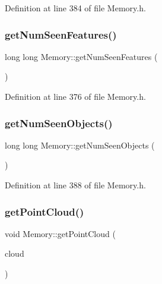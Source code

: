 Definition at line 384 of file Memory.\+h.

\mbox{\label{class_memory_aff0dd81352bffafc0989c71721f5c685}} 
\subsubsection{\texorpdfstring{get\+Num\+Seen\+Features()}{getNumSeenFeatures()}}
{\footnotesize\ttfamily long long Memory\+::get\+Num\+Seen\+Features (\begin{DoxyParamCaption}{ }\end{DoxyParamCaption})\hspace{0.3cm}{\ttfamily [inline]}}



Definition at line 376 of file Memory.\+h.

\mbox{\label{class_memory_aee4eb4b1f005a36bd59a0b159d6b8a32}} 
\subsubsection{\texorpdfstring{get\+Num\+Seen\+Objects()}{getNumSeenObjects()}}
{\footnotesize\ttfamily long long Memory\+::get\+Num\+Seen\+Objects (\begin{DoxyParamCaption}{ }\end{DoxyParamCaption})\hspace{0.3cm}{\ttfamily [inline]}}



Definition at line 388 of file Memory.\+h.

\mbox{\label{class_memory_a9861a7a0fa823cc992f96651a08a177d}} 
\subsubsection{\texorpdfstring{get\+Point\+Cloud()}{getPointCloud()}}
{\footnotesize\ttfamily void Memory\+::get\+Point\+Cloud (\begin{DoxyParamCaption}\item[{pcl\+::\+Point\+Cloud$<$ pcl\+::\+Histogram$<$ 153 $>$ $>$\+::Ptr \&}]{cloud }\end{DoxyParamCaption})}



